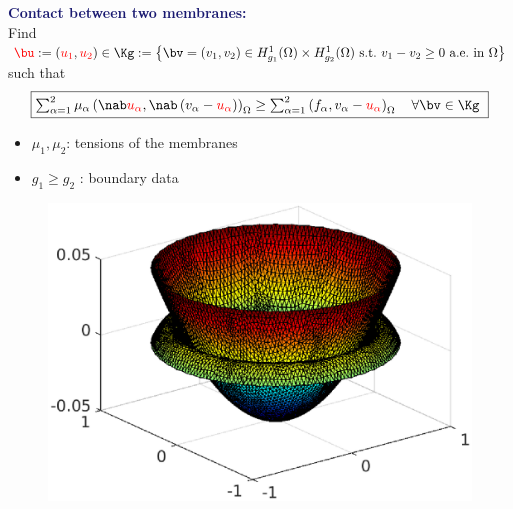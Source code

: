 \documentclass[aspectratio=169]{beamer}
\begin{document}
\begin{frame}
\textcolor{midnightblue}{\textbf{Contact between two membranes:}}
\\
\vspace*{0.1 cm}
Find $\textcolor{red}{\bu}:=(\textcolor{red}{u_1},\textcolor{red}{u_2}) \in \Kg := \left\{ \bv = \left(v_1,v_2\right) \in H_{g_1}^1(\Omega) \times H_{g_2}^1(\Omega) \ \text{s.t.} \ v_1 - v_2 \geq 0  \ \text{a.e.} \ \text{in} \ \Omega \right\}$ such that
 \begin{equation*}
  \fbox{$ \sum_{\alpha=1}^2 \mu_{\alpha}
   \left( \nab \textcolor{red}{u_{\alpha}}, \nab \left(v_{\alpha} - \textcolor{red}{u_{\alpha}} \right) \right)_{\Omega} \geq
   \sum_{\alpha=1}^2 \left(f_{\alpha}, v_{\alpha} - \textcolor{red}{u_{\alpha}} \right)_{\Omega} \quad \forall \bv \in \Kg$ }
 \end{equation*}
 \begin{minipage}{0.37 \linewidth}
 \begin{itemize}
 \item $\mu_1, \mu_2$: tensions of the membranes
   \item $g_1 \geq g_2$ : boundary data
\end{itemize} 
 \end{minipage}
 \hfill
 \begin{minipage}{0.55 \linewidth}
\begin{figure}
\includegraphics[scale = 0.5]{fig_article_chap_1/fig_membrane_cv.eps}    
\end{figure}
\end{minipage}

 \end{frame}
\end{document}
